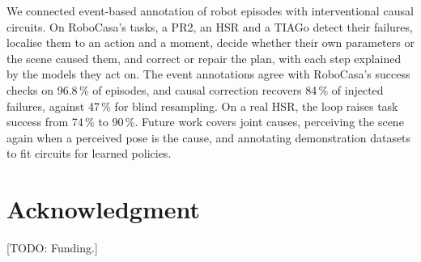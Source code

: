 \documentclass[letterpaper, 10 pt, conference]{ieeeconf}
\newcommand{\todo}[1]{{\color{red}[TODO: #1]}}
\newcommand{\dummystyle}{\color{dummy}}
\newcommand{\todo}[1]{}
\newcommand{\dummystyle}{}
\newcommand{\dummy}[1]{{\dummystyle #1}}
\newcommand{\dummynote}[1]{{\dummystyle[#1]}}
\newcommand{\dummynote}[1]{}
\newcommand{\robocasa}{RoboCasa}
\begin{document}
We connected event-based annotation of robot episodes with interventional
causal circuits. On \robocasa{}'s tasks, a PR2, an HSR and a TIAGo detect their
failures, localise them to an action and a moment, decide whether their own
parameters or the scene caused them, and correct or repair the plan, with each
step explained by the models they act on. The event annotations agree with \robocasa{}'s success checks on
\dummy{96.8}\,\% of episodes, and causal correction recovers \dummy{84}\,\% of
injected failures, against \dummy{47}\,\% for blind resampling. On a real HSR,
the loop raises task success from \dummy{74}\,\% to \dummy{90}\,\%. Future work
covers joint causes, perceiving the scene again when a perceived pose is the
cause, and annotating demonstration datasets to fit circuits for learned
policies.


\section*{Acknowledgment}
\todo{Funding.}




\end{document}
